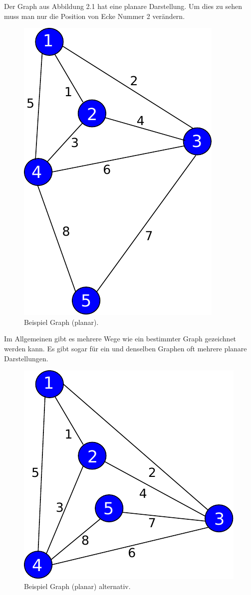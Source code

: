\documentclass[11pt,a4paper,leqno]{report}
\numberwithin{equation}{chapter}
\begin{document}
\noindent
	Der Graph aus Abbildung 2.1 hat eine planare Darstellung. Um dies zu sehen muss man nur die Position von Ecke Nummer 2 ver\"andern.
\begin{figure}[H]
	\begin{center}
		\includegraphics[scale=0.4]{Abbildungen/graph_1_planar.pdf}
		\caption{Beispiel Graph (planar).}
	\end{center}
\end{figure}
\noindent
	Im Allgemeinen gibt es mehrere Wege wie ein bestimmter Graph gezeichnet werden kann. Es gibt sogar f\"ur ein und denselben Graphen oft mehrere planare Darstellungen.
\begin{figure}[H]
	\begin{center}
		\includegraphics[scale=0.4]{Abbildungen/graph_1_planar2.pdf}
		\caption{Beispiel Graph (planar) alternativ.}
	\end{center}
\end{figure}
\end{document}
